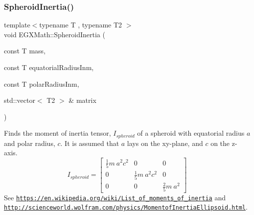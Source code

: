 \subsubsection{\texorpdfstring{Spheroid\+Inertia()}{SpheroidInertia()}\hspace{0.1cm}{\footnotesize\ttfamily [2/3]}}
{\footnotesize\ttfamily template$<$typename T , typename T2 $>$ \\
void E\+G\+X\+Math\+::\+Spheroid\+Inertia (\begin{DoxyParamCaption}\item[{const T}]{mass,  }\item[{const T}]{equatorial\+Radius\+Inm,  }\item[{const T}]{polar\+Radius\+Inm,  }\item[{std\+::vector$<$ T2 $>$ \&}]{matrix }\end{DoxyParamCaption})}



Finds the moment of inertia tensor, $I_{spheroid}$ of a spheroid with equatorial radius $a$ and polar radius, $c$. It is assumed that $a$ lays on the xy-\/plane, and $c$ on the z-\/axis. \[ I_{spheroid}=\begin{bmatrix} \frac{1}{5}m\ a^2c^2 & 0 & 0\\ 0 & \frac{1}{5}m\ a^2c^2 & 0\\ 0 & 0 & \frac{2}{5}m\ a^2 \end{bmatrix} \] See \href{https://en.wikipedia.org/wiki/List_of_moments_of_inertia}{\tt https\+://en.\+wikipedia.\+org/wiki/\+List\+\_\+of\+\_\+moments\+\_\+of\+\_\+inertia} and \href{http://scienceworld.wolfram.com/physics/MomentofInertiaEllipsoid.html}{\tt http\+://scienceworld.\+wolfram.\+com/physics/\+Momentof\+Inertia\+Ellipsoid.\+html}. 


